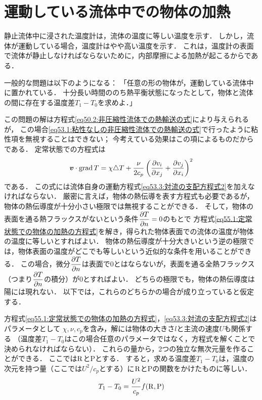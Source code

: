 \section{運動している流体中での物体の加熱}

静止流体中に浸された温度計は，流体の温度に等しい温度を示す．
しかし，流体が運動している場合，温度計はやや高い温度を示す．
これは，温度計の表面で流体が静止しなければならないために，内部摩擦による加熱が起こるからである．

一般的な問題は以下のようになる：
「任意の形の物体が，運動している流体中に置かれている．
十分長い時間ののち熱平衡状態になったとして，物体と流体の間に存在する温度差$T_1-T_0$を求めよ．」



この問題の解は方程式\eqref{eq50.2:非圧縮性流体での熱輸送の式}により与えられるが，
この場合\eqref{eq53.1:粘性なしの非圧縮性流体での熱輸送の式}で行ったように粘性項を無視することはできない；
今考えている効果はこの項によるものだからである．
定常状態での方程式は
\begin{equation}\label{eq55.1:定常状態での物体の加熱の方程式}
    \vb*{v} \cdot \operatorname{grad} T = \chi \triangle T + \frac{\nu}{2c_p} \left( \pdv{v_i}{x_j} + \pdv{v_j}{x_i} \right)^2
\end{equation}
である．
この式には流体自身の運動方程式\eqref{eq53.3:対流の支配方程式2}を加えなければならない．
厳密に言えば，物体の熱伝導を表す方程式も必要であるが，物体の熱伝導度が十分小さい極限では無視することができる．
そして，物体の表面を通る熱フラックスがないという条件$\dpdv{T}{n}=0$のもとで
方程式\eqref{eq55.1:定常状態での物体の加熱の方程式}を解き，得られた物体表面での流体の温度が物体の温度に等しいとすればよい．
物体の熱伝導度が十分大きいという逆の極限では，物体表面の温度がどこでも等しいという近似的な条件を用いることができる．
この場合，微分$\dpdv{T}{n}$は表面で0とはならないが，表面を通る全熱フラックス（つまり$\dpdv{T}{n}$の積分）が0とすればよい．
どちらの極限でも，物体の熱伝導度は陽には現れない．
以下では，これらのどちらかの場合が成り立っていると仮定する．


方程式\eqref{eq55.1:定常状態での物体の加熱の方程式}，\eqref{eq53.3:対流の支配方程式2}はパラメータとして
$\chi,\nu,c_p$を含み，解には物体の大きさ$l$と主流の速度$U$も関係する
（温度差$T_1-T_0$はこの場合任意のパラメータではなく，方程式を解くことで決められなければならない）．
これらの量から，2つの独立な無次元量を作ることができる．
ここでは$\mathrm{R}$と$\mathrm{P}$とする．
すると，求める温度差$T_1-T_0$は，温度の次元を持つ量（ここでは$U^2/c_p$とする）に$\mathrm{R}$と$\mathrm{P}$の関数をかけたものに等しい．
\begin{equation}
    T_1 - T_0 = \frac{U^2}{c_p} f(\mathrm{R},\mathrm{P})
\end{equation}

